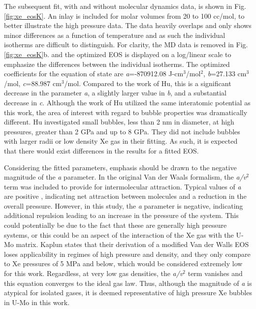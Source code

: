 \documentclass[review]{elsarticle}
\begin{document}
The subsequent fit, with and without molecular dynamics data, is shown in Fig. \ref{fig:xe_eosK}. An inlay is included for molar volumes from 20 to 100 cc/mol, to better illustrate the high pressure data. The data heavily overlaps and only shows minor differences as a function of temperature and as such the individual isotherms are difficult to distinguish. For clarity, the MD data is removed in Fig. \ref{fig:xe_eosK}b. and the optimized EOS is displayed on a log/linear scale to emphasize the differences between the individual isotherms. The optimized coefficients for the equation of state are \textit{a}=-870912.08 J-cm$^3$/mol$^2$, \textit{b}=27.133 cm$^3$/mol, \textit{c}=88.987 cm$^3$/mol. Compared to the work of Hu, this is a significant decrease in the parameter \textit{a}, a slightly larger value in \textit{b}, and a substantial decrease in \textit{c}. Although the work of Hu utilized the same interatomic potential as this work, the area of interest with regard to bubble properties was dramatically different. Hu investigated small bubbles, less than 2 nm in diameter, at high pressures, greater than 2 GPa and up to 8 GPa. They did not include bubbles with larger radii or low density Xe gas in their fitting.  As such, it is expected that there would exist differences in the results for a fitted EOS. 

Considering the fitted parameters, emphasis should be drawn to the negative magnitude of the \textit{a} parameter. In the original Van der Waals formalism, the \textit{a/v$^2$} term was included to provide for intermolecular attraction. Typical values of \textit{a} are positive \cite{kaplun2003}, indicating net attraction between molecules and a reduction in the overall pressure. However, in this study, the \textit{a} parameter is negative, indicating additional repulsion leading to an increase in the pressure of the system. This could potentially be due to the fact that these are generally high pressure systems, or this could be an aspect of the interaction of the Xe gas with the U-Mo matrix. Kaplun states that their derivation of a modified Van der Walls EOS loses applicability in regimes of high pressure and density, and they only compare to Xe pressures of 5 MPa and below, which would be considered extremely low for this work. Regardless, at very low gas densities, the \textit{a/v$^2$} term vanishes and this equation converges to the ideal gas law. Thus, although the magnitude of \textit{a} is atypical for isolated gases, it is deemed representative of high pressure Xe bubbles in U-Mo in this work.
\end{document}

